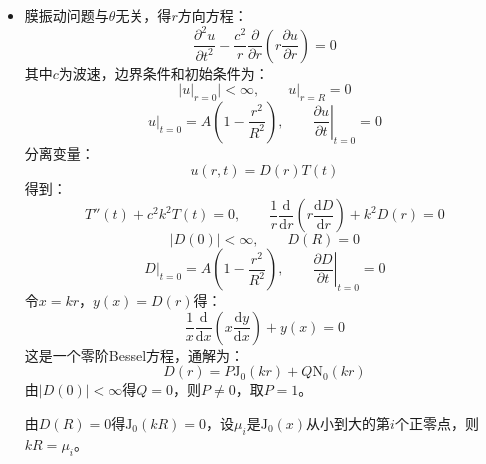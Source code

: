 \documentclass[fontset=windows]{ctexart}
\begin{document}
\begin{itemize}
    \item[4.]
    膜振动问题与$\theta$无关，得$r$方向方程：
    \[
    \frac{\partial^2 u}{\partial t^2} - \frac{c^2}{r}\frac{\partial}{\partial r}\left(r\frac{\partial u}{\partial r}\right) = 0
    \]
    其中$c$为波速，边界条件和初始条件为：
    \[
    \Big|u|_{r=0}\Big| < \infty,\qquad \left.u\right|_{r=R} = 0
    \]
    \[
    \left.u\right|_{t=0} = A\left(1 - \frac{r^2}{R^2}\right),\qquad \left.\frac{\partial u}{\partial t}\right|_{t=0} = 0
    \]
    分离变量：
    \[
    u(r,t) = D(r)T(t)
    \]
    得到：
    \[
    T''(t) + c^2 k^2 T(t) = 0,\qquad \frac{1}{r}\frac{\mathrm{d}}{\mathrm{d}r}\left(r\frac{\mathrm{d}D}{\mathrm{d}r}\right) + k^2 D(r) = 0
    \]
    \[
    |D(0)| < \infty,\qquad D(R) = 0
    \]
    \[
    \left.D\right|_{t=0} = A\left(1 - \frac{r^2}{R^2}\right),\qquad \left.\frac{\partial D}{\partial t}\right|_{t=0} = 0
    \]
    令$x = kr$，$y(x) = D(r)$得：
    \[
    \frac{1}{x}\frac{\mathrm{d}}{\mathrm{d}x}\left(x\frac{\mathrm{d}y}{\mathrm{d}x}\right) + y(x) = 0
    \]
    这是一个零阶Bessel方程，通解为：
    \[
    D(r) = P\mathrm{J}_0(kr) + Q\mathrm{N}_0(kr)
    \]
    由$|D(0)| < \infty$得$Q = 0$，则$P \neq 0$，取$P = 1$。

    由$D(R) = 0$得$\mathrm{J}_0(kR) = 0$，设$\mu_i$是$\mathrm{J}_0(x)$从小到大的第$i$个正零点，则$kR = \mu_i$。


\end{itemize}
\end{document}

